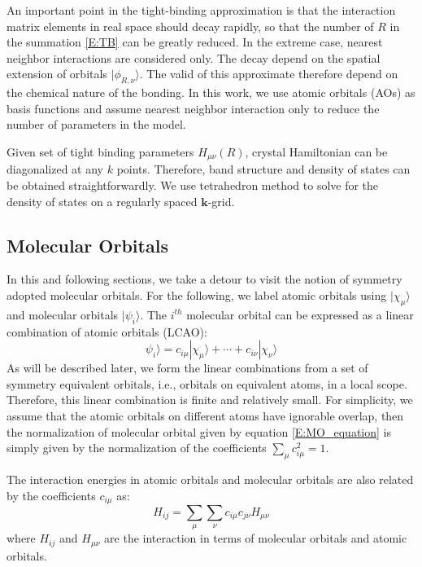 \documentclass{article}
\begin{document}
An important point in the tight-binding approximation is that the interaction matrix elements in real
space should decay rapidly, so that the number of $R$ in the summation \eqref{E:TB} can be greatly 
reduced. In the extreme case, nearest neighbor interactions are considered only. 
The decay depend on the spatial extension of orbitals $|\phi_{R,\nu}\rangle$. 
The valid of this approximate therefore depend on the chemical nature of the bonding. In this work, we use 
atomic orbitals (AOs) as basis functions and assume nearest neighbor interaction only to reduce the 
number of parameters in the model. 

Given set of tight binding parameters $H_{\mu\nu}(R)$, crystal Hamiltonian can be diagonalized at any $k$ points. Therefore, 
band structure and density of states can be obtained straightforwardly. We use tetrahedron method to solve for 
the density of states on a regularly spaced $\mathbf{k}$-grid. 

\subsection{Molecular Orbitals}
In this and following sections, we take a detour to visit the notion of symmetry adopted molecular orbitals. 
For the following, we label atomic orbitals using $|\chi_{\mu}\rangle$ and molecular orbitals $|\psi_i\rangle$. The $i^{th}$ molecular 
orbital can be expressed as a linear combination of atomic orbitals (LCAO): 
\begin{equation}
    \label{E:MO_equation}
    \psi_i\rangle = c_{i\mu} |\chi_{\mu}\rangle + \cdots + c_{i\nu} |\chi_{\nu}\rangle
\end{equation}
As will be described later, we form the linear combinations from a set of symmetry equivalent orbitals, i.e., orbitals 
on equivalent atoms, in a local scope. Therefore, this linear combination is finite and relatively small. For simplicity,
we assume that the atomic orbitals on different atoms have ignorable overlap, then the normalization 
of molecular orbital given by equation \eqref{E:MO_equation} is simply given by the normalization of the 
coefficients $\sum_{\mu}c_{i\mu}^2 = 1$.

The interaction energies in atomic orbitals and molecular orbitals are also related by the coefficients $c_{i\mu}$ as:
\begin{equation}
    \label{E:HAO_HMO_transformation}
    H_{ij} = \sum_{\mu} \sum_{\nu} c_{i\mu} c_{j\nu} H_{\mu\nu}
\end{equation}
where $H_{ij}$ and $H_{\mu\nu}$ are the interaction in terms of molecular orbitals and atomic orbitals. 
\end{document}
